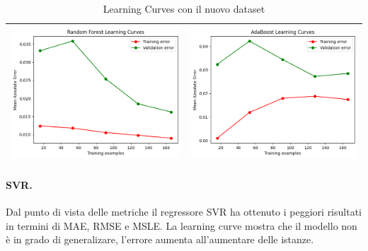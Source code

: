 \begin{table}[H]
\begin{tabularx}{\textwidth}{|X|X|}
        \includegraphics[width=\linewidth, trim=0 0 0 0]{images/RandomForestRegressor_lc2.png} &
        \includegraphics[width=\linewidth, trim=0 0 0 0]{images/AdaBoostRegressor_lc2.png} \\
        \hline
    \end{tabularx}
    \caption{Learning Curves con il nuovo dataset}
    \label{tab:emissions_info}
\end{table}

\paragraph{\textbf{SVR}.}
Dal punto di vista delle metriche il regressore SVR ha ottenuto i peggiori risultati in termini di MAE, RMSE e MSLE. La learning curve mostra che il modello non è in grado di generalizare, l'errore aumenta all'aumentare delle istanze.

